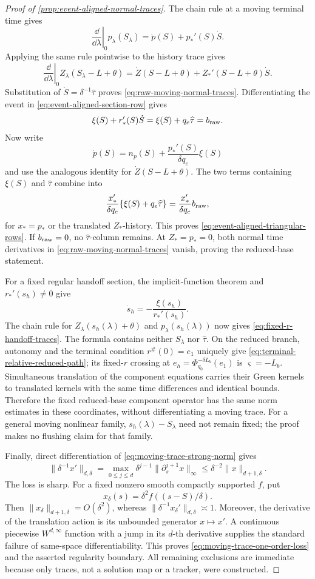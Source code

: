 \begin{proof}[Proof of \cref{prop:event-aligned-normal-traces}]
The chain rule at a moving terminal time gives
\[
 \left.\frac{\dd}{\dd\lambda}\right|_0
 p_\lambda(S_\lambda)
 =\dot p(S)+p_*'(S)\dot S.
\]
Applying the same rule pointwise to the history trace gives
\[
 \left.\frac{\dd}{\dd\lambda}\right|_0
 Z_\lambda(S_\lambda-L+\theta)
 =\dot Z(S-L+\theta)+Z_*'(S-L+\theta)\dot S.
\]
Substitution of
\(\dot S=\delta^{-1}\widehat\tau\) proves
\cref{eq:raw-moving-normal-traces}.  Differentiating the event in
\cref{eq:event-aligned-section-row} gives
\[
 \xi(S)+r_*'(S)\dot S
 =\xi(S)+q_e\widehat\tau=b_{\rm raw}.
\]
Now write
\[
 \dot p(S)
 =n_p(S)+\frac{p_*'(S)}{\delta q_e}\xi(S)
\]
and use the analogous identity for \(\dot Z(S-L+\theta)\).  The two
terms containing \(\xi(S)\) and \(\widehat\tau\) combine into
\[
 \frac{x_*'}{\delta q_e}
       \{\xi(S)+q_e\widehat\tau\}
 =\frac{x_*'}{\delta q_e}b_{\rm raw},
\]
for \(x_*=p_*\) or the translated \(Z_*\)-history.  This proves
\cref{eq:event-aligned-triangular-rows}.  If \(b_{\rm raw}=0\), no
\(\widehat\tau\)-column remains.  At \(Z_*=p_*=0\), both normal time
derivatives in \cref{eq:raw-moving-normal-traces} vanish, proving the
reduced-base statement.

For a fixed regular handoff section, the implicit-function theorem and
\(r_*'(s_h)\ne0\) give
\[
 \dot s_h=-\frac{\xi(s_h)}{r_*'(s_h)}.
\]
The chain rule for
\(Z_\lambda(s_h(\lambda)+\theta)\) and
\(p_\lambda(s_h(\lambda))\) now gives
\cref{eq:fixed-r-handoff-traces}.  The formula contains neither
\(S_\lambda\) nor \(\widehat\tau\).  On the reduced branch, autonomy and
the terminal condition \(r^\#(0)=e_1\) uniquely give
\cref{eq:terminal-relative-reduced-path}; its fixed-\(r\) crossing at
\(e_h=\Phi_{q_0}^{-\delta L_b}(e_1)\) is
\(\varsigma=-L_b\).  Simultaneous translation of the component equations
carries their Green kernels to translated kernels with the same time
differences and identical bounds.  Therefore the fixed reduced-base
component operator has the same norm estimates in these coordinates,
without differentiating a moving trace.  For a general
moving nonlinear family, \(s_h(\lambda)-S_\lambda\) need not remain fixed;
the proof makes no flushing claim for that family.

Finally, direct differentiation of
\cref{eq:moving-trace-strong-norm} gives
\[
 \|\delta^{-1}x'\|_{d,\delta}
 =\max_{0\le j\le d}\delta^{j-1}
       \|\partial_s^{j+1}x\|_\infty
 \le\delta^{-2}\|x\|_{d+1,\delta}.
\]
The loss is sharp.  For a fixed nonzero smooth compactly supported \(f\),
put
\[
 x_\delta(s)=\delta^2f((s-S)/\delta).
\]
Then
\(\|x_\delta\|_{d+1,\delta}=O(\delta^2)\), whereas
\(\|\delta^{-1}x_\delta'\|_{d,\delta}\asymp1\).
Moreover, the derivative of the translation action is its unbounded
generator \(x\mapsto x'\).  A continuous piecewise
\(W^{d,\infty}\) function with a jump in its \(d\)-th derivative supplies
the standard failure of same-space differentiability.  This proves
\cref{eq:moving-trace-one-order-loss} and the asserted regularity boundary.
All remaining exclusions are immediate because only traces, not a solution
map or a tracker, were constructed.
\end{proof}

